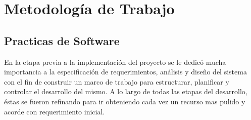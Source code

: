 \chapter{Metodología de Trabajo}

\section{Practicas de Software}
En la etapa previa a la implementación del proyecto se le dedicó mucha importancia a la especificación de requerimientos, análisis y
diseño del sistema con el fin de construir un marco de trabajo para estructurar, planificar y controlar el desarrollo del mismo. A lo
largo de todas las etapas del desarrollo, éstas se fueron refinando para ir obteniendo cada vez un recurso mas pulido y acorde con
requerimiento inicial.

